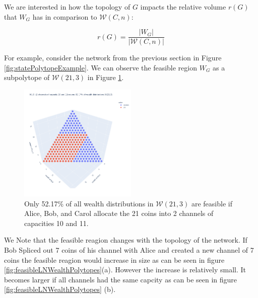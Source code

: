 \documentclass[10pt,twocolumn]{article}
\begin{document}
We are interested in how the topology of \( G \) impacts the relative volume \( r(G) \) that \( W_G \) has in comparison to \( \mathcal{W}(C,n) \):

\begin{equation}
r(G) = \frac{|W_G|}{|\mathcal{W}(C,n)|}
\label{eq:relVolume}
\end{equation}

For example, consider the network from the previous section in Figure \ref{fig:statePolytopeExample}. We can observe the feasible region \( W_G \) as a subpolytope of \( \mathcal{W}(21,3) \) in Figure \ref{fig:wealthPolytope}.

\begin{figure}[h]
\centering
\includegraphics[width=0.5\textwidth]{polytope_of_wealth_distributions_with_ln}
\caption{Only 52.17\% of all wealth distributions in \( \mathcal{W}(21,3) \) are feasible if Alice, Bob, and Carol allocate the 21 coins into 2 channels of capacities 10 and 11.}
\label{fig:wealthPolytope}
\end{figure}

We Note that the feasible reagion changes with the topology of the network.
If Bob Spliced out 7 coins of his channel with Alice and created a new channel of 7 coins the feasible reagion would increase in size as can be seen in figure \ref{fig:feasibleLNWealthPolytopes}(a).
However the increase is relatively small.
It becomes larger if all channels had the same capcity as can be seen in figure \ref{fig:feasibleLNWealthPolytopes} (b).
\end{document}
